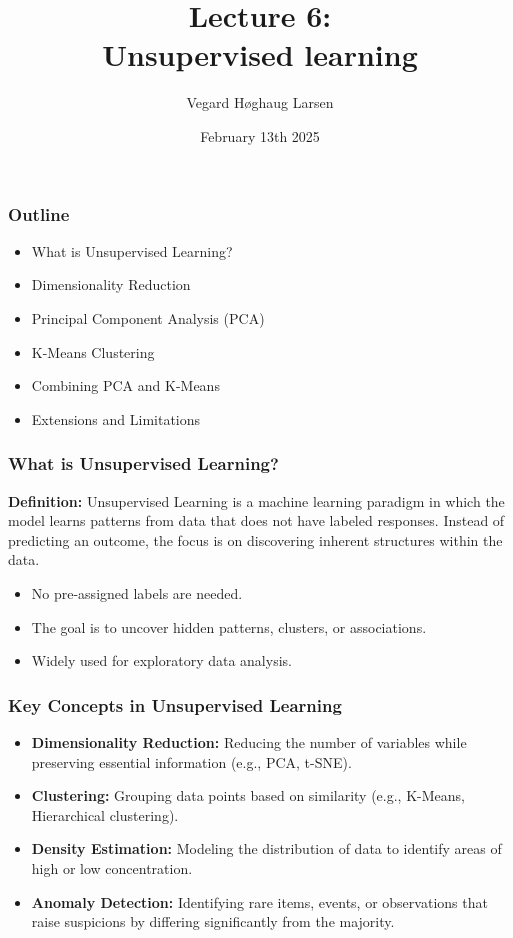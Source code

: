 \documentclass[aspectratio=169]{beamer}
\title{Lecture 6:\\ Unsupervised learning}
\institute{GRA4160: Predictive modelling with machine learning}
\date{February 13th 2025}
\author{Vegard H\o ghaug Larsen}
\begin{document}
\maketitle

\begin{frame}
\frametitle{Outline}
\begin{itemize}
    \item What is Unsupervised Learning?
    \item Dimensionality Reduction
    \item Principal Component Analysis (PCA)
    \item K-Means Clustering
    \item Combining PCA and K-Means
    \item Extensions and Limitations
\end{itemize}
\end{frame}

\begin{frame}
    \frametitle{What is Unsupervised Learning?}
    \textbf{Definition:} Unsupervised Learning is a machine learning paradigm in which the model learns patterns from data that does not have labeled responses. Instead of predicting an outcome, the focus is on discovering inherent structures within the data.

    \vspace{0.5cm}
    \begin{itemize}
        \item No pre-assigned labels are needed.
        \item The goal is to uncover hidden patterns, clusters, or associations.
        \item Widely used for exploratory data analysis.
    \end{itemize}
\end{frame}

\begin{frame}
    \frametitle{Key Concepts in Unsupervised Learning}
    \begin{itemize}
        \item \textbf{Dimensionality Reduction:} Reducing the number of variables while preserving essential information (e.g., PCA, t-SNE).
        \item \textbf{Clustering:} Grouping data points based on similarity (e.g., K-Means, Hierarchical clustering).
        \item \textbf{Density Estimation:} Modeling the distribution of data to identify areas of high or low concentration.
        \item \textbf{Anomaly Detection:} Identifying rare items, events, or observations that raise suspicions by differing significantly from the majority.
    \end{itemize}
\end{frame}
\end{document}
